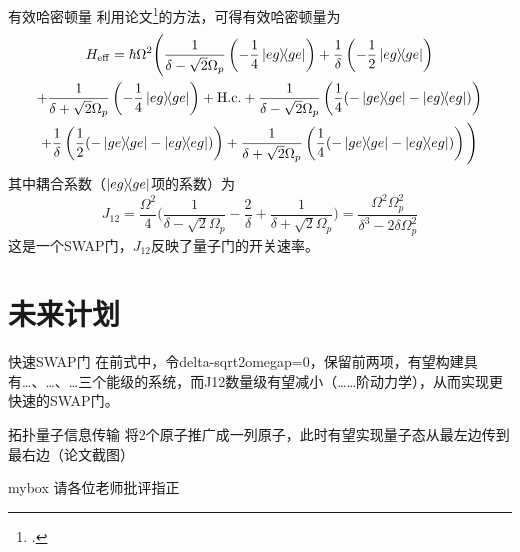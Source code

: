 \documentclass[10pt,aspectratio=43]{beamer}
\begin{document}
\begin{frame}{有效哈密顿量}
利用论文\footcite{James2007EffectiveHT}的方法，可得有效哈密顿量为
{\footnotesize\begin{multline}
H_{\mathrm{eff}}=\hbar\Omega^2\Bigg(\frac{1}{\delta-\sqrt{2}\Omega_p}\left(-\frac{1}{4}\ketbra{eg}{ge}\right)+\frac{1}{\delta}\left(-\frac{1}{2}\ketbra{eg}{ge}\right)\\
+\frac{1}{\delta+\sqrt{2}\Omega_p}\left(-\frac{1}{4}\ketbra{eg}{ge}\right)+\mathrm{H.c.}
+\frac{1}{\delta-\sqrt{2}\Omega_p}\left(\frac{1}{4}(-\ketbra{ge}{ge}-\ketbra{eg}{eg})\right)\\
+\frac{1}{\delta}\left(\frac{1}{2}(-\ketbra{ge}{ge}-\ketbra{eg}{eg})\right)
+\frac{1}{\delta+\sqrt{2}\Omega_p}\left(\frac{1}{4}(-\ketbra{ge}{ge}-\ketbra{eg}{eg})\right)\Bigg)
\end{multline}}
其中耦合系数（$ \ketbra{eg}{ge} $项的系数）为
{\small\begin{equation}
J_{12}=\frac{\Omega^2}{4}\Bigg(\frac{1}{\delta-\sqrt{2}\Omega_p}-\frac{2}{\delta}+\frac{1}{\delta+\sqrt{2}\Omega_p}\Bigg)=\frac{\Omega^2\Omega_p^2}{\delta^3-2\delta\Omega_p^2}
\end{equation}}
这是一个SWAP门，$ J_{12} $反映了量子门的开关速率。
\end{frame}
\section{未来计划}
\begin{frame}{快速SWAP门}
在前式中，令delta-sqrt2omegap=0，保留前两项，有望构建具有…、…、…三个能级的系统，而J12数量级有望减小（……阶动力学），从而实现更快速的SWAP门。
\end{frame}
\begin{frame}{拓扑量子信息传输}
将2个原子推广成一列原子，此时有望实现量子态从最左边传到最右边（论文截图）
\end{frame}


\begin{frame}{}
\begin{center}
\begin{minipage}{1\textwidth}
\begin{beamercolorbox}[wd=0.70\textwidth, rounded=true, shadow=true]{mybox}
\LARGE \centering 请各位老师批评指正
\end{beamercolorbox}
\end{minipage}
\end{center}
\end{frame}
\end{document}
